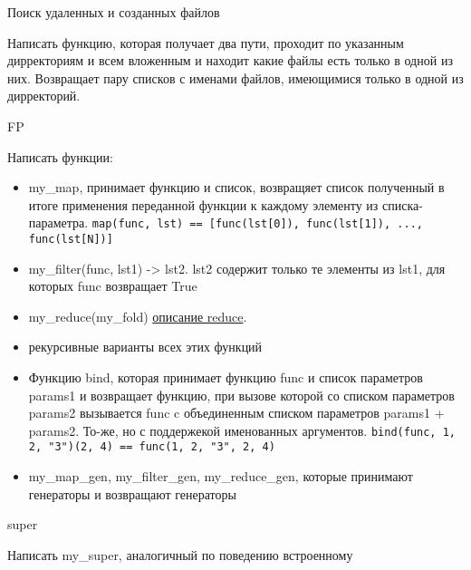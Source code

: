 \documentclass{article}
\begin{document}
\begin{center} Поиск удаленных и созданных файлов \end{center}
Написать функцию, которая получает два пути, проходит по 
указанным дирректориям и всем вложенным и находит какие файлы 
есть только в одной из них. Возвращает пару списков с именами файлов,
имеющимися только в одной из дирректорий.
\newpage

\begin{center} FP \end{center}
Написать функции:
\begin{itemize}
    \item my\_map, принимает функцию и список, 
            возвращяет список полученный в итоге применения переданной функции 
            к каждому элементу из списка-параметра. 
            \lstinline!map(func, lst) == [func(lst[0]), func(lst[1]), ..., func(lst[N])]!
    \item my\_filter(func, lst1) -> lst2. lst2 содержит только те элементы из lst1,
          для которых func возвращает True
    \item my\_reduce(my\_fold) 
\href{http://ru.wikipedia.org/wiki/%D0%A1%D0%B2%D1%91%D1%80%D1%82%D0%BA%D0%B0_%D1%81%D0%BF%D0%B8%D1%81%D0%BA%D0%B0}{описание reduce}.
    \item рекурсивные варианты всех этих функций
    \item Функцию bind, которая принимает функцию func и список параметров params1
          и возвращает функцию, при вызове которой со списком параметров params2 вызывается
          func c объединенным списком параметров params1 + params2.
          То-же, но с поддержекой именованных аргументов.
          \lstinline!bind(func, 1, 2, "3")(2, 4) == func(1, 2, "3", 2, 4)!
    \item my\_map\_gen, my\_filter\_gen, my\_reduce\_gen, которые принимают генераторы и возвращают генераторы
\end{itemize}
\newpage

\begin{center} super \end{center}
Написать my\_super, аналогичный по поведению встроенному 
\newpage
\end{document}
